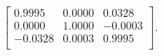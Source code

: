 \begin{equation*}
\begin{bmatrix}
  0.9995 &   0.0000 &   0.0328 \\
  0.0000 &   1.0000 &  -0.0003 \\
 -0.0328 &   0.0003 &   0.9995 \\
\end{bmatrix}.
\end{equation*}
